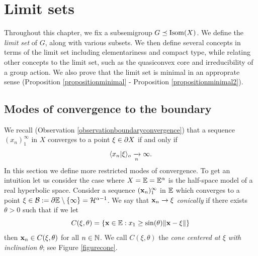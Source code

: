 



\draftnewpage
\chapter{Limit sets} \label{sectionlimitsets}

Throughout this chapter, we fix a subsemigroup $G\preceq\operatorname{Isom}(X)$. We define the \emph{limit set} of $G$, along with various subsets. We then define several concepts in terms of the limit set including elementariness and compact type, while relating other concepts to the limit set, such as the quasiconvex core and irreducibility of a group action. We also prove that the limit set is minimal in an approprate sense (Proposition \ref{propositionminimal} - Proposition \ref{propositionminimal2}).


\bigskip
\section{Modes of convergence to the boundary}
\label{subsectionmodes}
We recall (Observation \ref{observationboundaryconvergence}) that a sequence $(x_n)_1^\infty$ in $X$ converges to a point $\xi\in\partial X$ if and only if
\[
\langle x_n|\xi\rangle_o \xrightarrow[n]{} \infty.
\]
In this section we define more restricted modes of convergence. To get an intuition let us consider the case where $X = \E = \E^\alpha$ is the half-space model of a real hyperbolic space. Consider a sequence $(\mathbf x_n)_1^\infty$ in $\E$ which converges to a point $\xi\in\BB := \del\E\butnot\{\infty\} = \HH^{\alpha - 1}$. We say that $\mathbf x_n \to \xi$ \emph{conically} if there exists $\theta > 0$ such that if we let
\[
C(\xi,\theta) = \{\xx\in\E: x_1 \geq \sin(\theta)\|\xx - \xi\|\}
\]
then $\mathbf x_n\in C(\xi,\theta)$ for all $n\in\N$. We call $C(\xi,\theta)$ the \emph{cone centered at $\xi$ with inclination $\theta$}; see Figure \ref{figurecone}.




